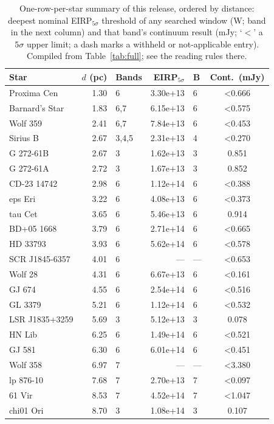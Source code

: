 \documentclass{openjournal}
\begin{document}
\begin{table}
\centering
\scriptsize
\setlength{\tabcolsep}{4pt}
\caption{One-row-per-star summary of this release, ordered by
distance: deepest nominal EIRP$_{5\sigma}$ threshold of any searched
window (W; band in the next column) and that band's continuum result
(mJy; `$<$' a $5\sigma$ upper limit; a dash marks a withheld or
not-applicable entry). Compiled from Table~\ref{tab:full}; see the reading rules
there.}
\label{tab:starsummary}
\begin{tabular}{@{}lrlrlc@{}}
\hline
Star & $d$ (pc) & Bands & EIRP$_{5\sigma}$ & B & Cont.\ (mJy) \\
\hline
Proxima Cen & 1.30 & 6 & 3.30e+13 & 6 & <0.666 \\
Barnard's Star & 1.83 & 6,7 & 6.15e+13 & 6 & <0.575 \\
Wolf  359 & 2.41 & 6,7 & 7.84e+13 & 6 & <0.453 \\
Sirius B & 2.67 & 3,4,5 & 2.31e+13 & 4 & <0.270 \\
G 272-61B & 2.67 & 3 & 1.62e+13 & 3 & 0.851 \\
G 272-61A & 2.72 & 3 & 1.67e+13 & 3 & 0.852 \\
CD-23 14742 & 2.98 & 6 & 1.12e+14 & 6 & <0.388 \\
eps Eri & 3.22 & 6 & 4.08e+13 & 6 & <0.373 \\
tau Cet & 3.65 & 6 & 5.46e+13 & 6 & 0.914 \\
BD+05  1668 & 3.79 & 6 & 2.71e+14 & 6 & <0.665 \\
HD 33793 & 3.93 & 6 & 5.62e+14 & 6 & <0.578 \\
SCR J1845-6357 & 4.01 & 6 & --- & --- & <0.653 \\
Wolf   28 & 4.31 & 6 & 6.67e+13 & 6 & <0.161 \\
GJ 674 & 4.55 & 6 & 2.54e+14 & 6 & <0.516 \\
GL 3379 & 5.21 & 6 & 1.12e+14 & 6 & <0.532 \\
LSR J1835+3259 & 5.69 & 3 & 5.12e+13 & 3 & 0.078 \\
HN Lib & 6.25 & 6 & 1.49e+14 & 6 & <0.521 \\
GJ 581 & 6.30 & 6 & 6.01e+14 & 6 & <0.451 \\
Wolf  358 & 6.97 & 7 & --- & --- & <3.380 \\
lp 876-10 & 7.68 & 7 & 2.70e+13 & 7 & <0.097 \\
61 Vir & 8.53 & 7 & 4.52e+14 & 7 & <1.047 \\
chi01 Ori & 8.70 & 3 & 1.08e+14 & 3 & 0.107 \\

\end{tabular}
\end{table}
\end{document}
